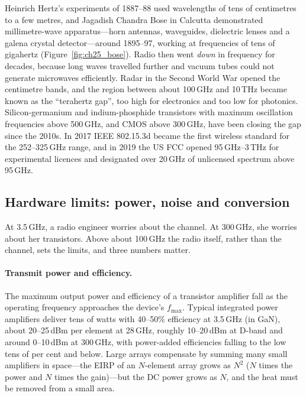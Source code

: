 
\begin{history}
Heinrich Hertz's experiments of 1887--88 used wavelengths of tens of centimetres to a few metres, and
Jagadish Chandra Bose in Calcutta demonstrated millimetre-wave apparatus---horn antennas, waveguides,
dielectric lenses and a galena crystal detector---around 1895--97, working at frequencies of tens of
gigahertz (Figure~\ref{fig:ch25_bose}). Radio then went \emph{down} in frequency for decades, because
long waves travelled further and vacuum tubes could not generate microwaves efficiently. Radar in the
Second World War opened the centimetre bands, and the region between about 100\,GHz and 10\,THz
became known as the ``terahertz gap'', too high for electronics and too low for photonics.
Silicon-germanium and indium-phosphide transistors with maximum oscillation frequencies above
500\,GHz, and CMOS above 300\,GHz, have been closing the gap since the 2010s. In 2017 IEEE 802.15.3d
became the first wireless standard for the 252--325\,GHz range, and in 2019 the US FCC opened
95\,GHz--3\,THz for experimental licences and designated over 20\,GHz of unlicensed spectrum above
95\,GHz.
\end{history}

\subsection{Hardware limits: power, noise and conversion}

At 3.5\,GHz, a radio engineer worries about the channel. At 300\,GHz, she worries about her
transistors. Above about 100\,GHz the radio itself, rather than the channel, sets the limits, and
three numbers matter.

\paragraph{Transmit power and efficiency.} The maximum output power and efficiency of a transistor
amplifier fall as the operating frequency approaches the device's $f_{\max}$. Typical integrated power
amplifiers deliver tens of watts with 40--50\% efficiency at 3.5\,GHz (in GaN), about 20--25\,dBm per
element at 28\,GHz, roughly 10--20\,dBm at D-band and around 0--10\,dBm at 300\,GHz, with
power-added efficiencies falling to the low tens of per cent and below. Large arrays compensate by
summing many small amplifiers in space---the EIRP of an $N$-element array grows as $N^2$ ($N$ times the
power and $N$ times the gain)---but the DC power grows as $N$, and the heat must be removed from a
small area.

